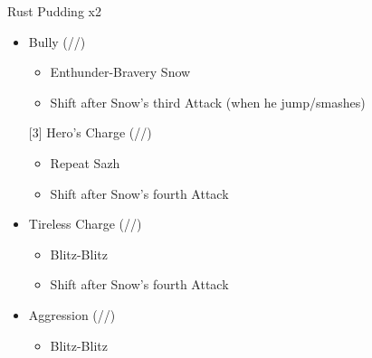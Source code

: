 \renewcommand{\first}{[1] }
\renewcommand{\second}{[2] Devastation (\com/\sab/\com)}
\renewcommand{\third}{[3] Hero's Charge (\syn/\med/\com)}
\renewcommand{\fourth}{[4] Tireless Charge (\com/\med/\com)}
\renewcommand{\fifth}{[5] Bully (\syn/\sab/\com)}
\renewcommand{\sixth}{[6] Aggression (\com/\rav/\com)}
	\begin{battle}[0:24]{Rust Pudding x2}
		\begin{itemize}
			\item \fifth
			      \begin{itemize}
				      \item Enthunder-Bravery Snow
				      \item Shift after Snow's third Attack (when he jump/smashes)
			      \end{itemize}
			      \third
			      \begin{itemize}
				      \item Repeat Sazh
				      \item Shift after Snow's fourth Attack
			      \end{itemize}
			\item \fourth
			      \begin{itemize}
				      \item Blitz-Blitz
				      \item Shift after Snow's fourth Attack
			      \end{itemize}
			\item \sixth
			      \begin{itemize}
				      \item Blitz-Blitz
			      \end{itemize}
		\end{itemize}
	\end{battle}
